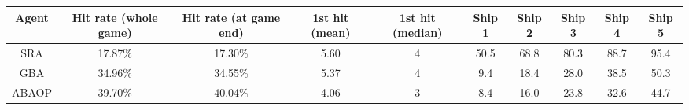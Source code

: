 \begin{tabular}{|c|c|c|c|c|c|c|c|c|c|}
\hline
\rowcolor{blue!20}
Agent & Hit rate (whole game) & Hit rate (at game end) & 1st hit (mean) & 1st hit (median) & Ship 1 & Ship 2 & Ship 3 & Ship 4 & Ship 5 \\ \hline
SRA & 17.87\% & 17.30\% & 5.60 & 4 & 50.5 & 68.8 & 80.3 & 88.7 & 95.4 \\ \hline
GBA & 34.96\% & 34.55\% & 5.37 & 4 & 9.4 & 18.4 & 28.0 & 38.5 & 50.3 \\ \hline
ABAOP & 39.70\% & 40.04\% & 4.06 & 3 & 8.4 & 16.0 & 23.8 & 32.6 & 44.7 \\ \hline
\end{tabular}
